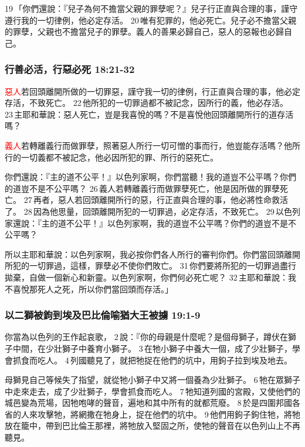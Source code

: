 19 「你們還說：『兒子為何不擔當父親的罪孽呢？』兒子行正直與合理的事，謹守遵行我的一切律例，他必定存活。 20 唯有犯罪的，他必死亡。兒子必不擔當父親的罪孽，父親也不擔當兒子的罪孽。義人的善果必歸自己，惡人的惡報也必歸自己。

\subsubsection{行善必活，行惡必死 18:21-32}
\textcolor{red}{惡人}若回頭離開所做的一切罪惡，謹守我一切的律例，行正直與合理的事，他必定存活，不致死亡。 22 他所犯的一切罪過都不被記念，因所行的義，他必存活。 23 主耶和華說：惡人死亡，豈是我喜悅的嗎？不是喜悅他回頭離開所行的道存活嗎？

\textcolor{red}{義人}若轉離義行而做罪孽，照著惡人所行一切可憎的事而行，他豈能存活嗎？他所行的一切義都不被記念，他必因所犯的罪、所行的惡死亡。

你們還說：『主的道不公平！』以色列家啊，你們當聽！我的道豈不公平嗎？你們的道豈不是不公平嗎？ 26 義人若轉離義行而做罪孽死亡，他是因所做的罪孽死亡。 27 再者，惡人若回頭離開所行的惡，行正直與合理的事，他必將性命救活了。 28 因為他思量，回頭離開所犯的一切罪過，必定存活，不致死亡。 29 以色列家還說：『主的道不公平！』以色列家啊，我的道豈不公平嗎？你們的道豈不是不公平嗎？

所以主耶和華說：以色列家啊，我必按你們各人所行的審判你們。你們當回頭離開所犯的一切罪過，這樣，罪孽必不使你們敗亡。 31 你們要將所犯的一切罪過盡行拋棄，自做一個新心和新靈。以色列家啊，你們何必死亡呢？ 32 主耶和華說：我不喜悅那死人之死，所以你們當回頭而存活。」

\subsubsection{以二獅被鉤到埃及巴比倫喻猶大王被擄 19:1-9}
你當為以色列的王作起哀歌， 2 說：『你的母親是什麼呢？是個母獅子，蹲伏在獅子中間，在少壯獅子中養育小獅子。 3 在牠小獅子中養大一個，成了少壯獅子，學會抓食而吃人。 4 列國聽見了，就把牠捉在他們的坑中，用鉤子拉到埃及地去。

母獅見自己等候失了指望，就從牠小獅子中又將一個養為少壯獅子。 6 牠在眾獅子中走來走去，成了少壯獅子，學會抓食而吃人。 7 牠知道列國的宮殿，又使他們的城邑變為荒場，因牠咆哮的聲音，遍地和其中所有的就都荒廢。 8 於是四圍邦國各省的人來攻擊牠，將網撒在牠身上，捉在他們的坑中。 9 他們用鉤子鉤住牠，將牠放在籠中，帶到巴比倫王那裡，將牠放入堅固之所，使牠的聲音在以色列山上不再聽見。

